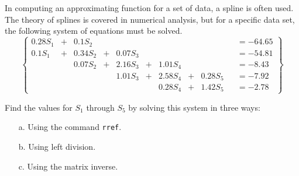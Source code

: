 {In computing an approximating function for a set of data, a spline is often used.  The theory of splines is covered in numerical analysis, but for a specific data set, the following system of equations must be solved.
\[
\left\{
\begin{array}{ccccccccccc}
0.28 S_1 &+& 0.1 S_2 &&&&&&&&= -64.65\\
0.1 S_1 &+& 0.34 S_2 &+ &0.07 S_3 &&&&&&= -54.81\\
&&0.07 S_2 &+& 2.16 S_3 &+ &1.01 S_4 &&&&= - 8.43\\
&&&&1.01 S_3 &+ &2.58 S_4 &+& 0.28 S_5 &&= -7.92\\
&&&&&&0.28 S_4 &+ &1.42 S_5 &&= -2.78
\end{array}
\right\}
\]

Find the values for $S_1$ through $S_5$ by solving this system in three ways:
\begin{enumerate}
\item[a.] Using the command \texttt{rref}.
\item[b.] Using left division.
\item[c.] Using the matrix inverse.
\end{enumerate}}
{}